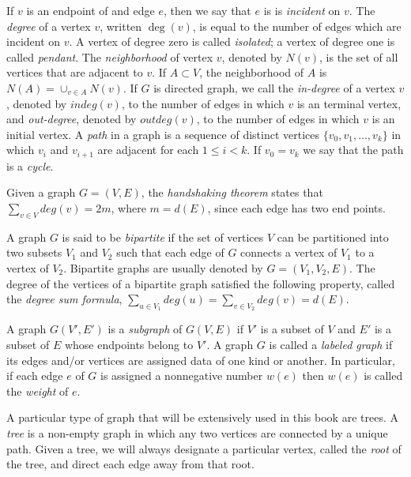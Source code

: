 If $v$ is an endpoint of and edge $e$, then we say that $e$ is is \emph{incident} on $v$. The \emph{degree} of a vertex $v$, written $\deg(v)$, is equal to the number of edges which are incident on $v$. A vertex of degree zero is called \emph{isolated}; a vertex of degree one is called \emph{pendant}. The \emph{neighborhood} of vertex $v$, denoted by $N(v)$, is the set of all vertices that are adjacent to $v$. If $A \subset V$, the neighborhood of $A$ is $N(A) = \cup_{v \in A} N(v)$. If $G$ is directed graph, we call the \emph{in-degree} of a vertex $v$, denoted by $indeg(v)$, to the number of edges in which $v$ is an terminal vertex, and \emph{out-degree}, denoted by $outdeg(v)$, to the number of edges in which $v$ is an initial vertex. A \emph{path} in a graph is a sequence of distinct vertices $\{v_{0}, v_{1}, \ldots ,v_{k}\}$ in which $v_{i}$ and $v_{i+1}$ are adjacent for each $1 \leq i < k$. If $v_{0} = v_{k}$ we say that the path is a \emph{cycle}.

\begin{example}
Given a graph $G=(V,E)$, the \emph{handshaking theorem} states that $\sum_{v \in V} deg(v) = 2 m$, where $m = d(E)$, since each edge has two end points.
\end{example}

A graph $G$ is said to be \emph{bipartite} if the set of vertices $V$ can be partitioned into two subsets $V_1$ and $V_2$ such that each edge of $G$ connects a vertex of $V_1$ to a vertex of $V_2$. Bipartite graphs are usually denoted by $G=(V_1, V_2, E)$. The degree of the vertices of a bipartite graph satisfied the following property, called the \emph{degree sum formula}, $\sum_{u \in V_1} deg(u) = \sum_{v \in V_2} deg(v) = d(E)$.

A graph $G(V',E')$ is a \emph{subgraph} of $G(V,E)$ if $V'$ is a subset of $V$ and $E'$ is a subset of $E$ whose endpoints belong to $V'$. A graph $G$ is called a \emph{labeled graph} if its edges and/or vertices are assigned data of one kind or another. In particular, if each edge $e$ of $G$ is assigned a nonnegative number $w(e)$ then $w(e)$ is called the \emph{weight} of $e$.

A particular type of graph that will be extensively used in this book are trees. A \emph{tree} is a non-empty graph in which any two vertices are connected by a unique path. Given a tree, we will always designate a particular vertex, called the \emph{root} of the tree, and direct each edge away from that root.

